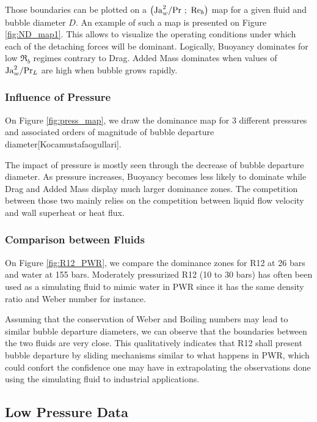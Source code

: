 Those boundaries can be plotted on a $\left( \mathrm{Ja}_{w}^{2}/\mathrm{Pr}\ ;\ \mathrm{Re}_{b} \right)$ map for a given fluid and bubble diameter $D$. An example of such a map is presented on Figure \ref{fig:ND_map1}. This allows to visualize the operating conditions under which each of the detaching forces will be dominant. Logically, Buoyancy dominates for low $\Re_{b}$ regimes contrary to Drag. Added Mass dominates when values of $\mathrm{Ja}_{w}^{2}/\mathrm{Pr}_{L}$ are high \ie when bubble grows rapidly.


\subsubsection{Influence of Pressure}

On Figure \ref{fig:press_map}, we draw the dominance map for 3 different pressures and associated orders of magnitude of bubble departure diameter[Kocamustafaogullari].

The impact of pressure is mostly seen through the decrease of bubble departure diameter. As pressure increases, Buoyancy becomes less likely to dominate while Drag and Added Mass display much larger dominance zones. The competition between those two mainly relies on the competition between liquid flow velocity and wall superheat or heat flux.

 
\subsubsection{Comparison between Fluids}

 
On Figure \ref{fig:R12_PWR}, we compare the dominance zones for R12 at 26 bars and water at 155 bars. Moderately pressurized R12 (10 to 30 bars) has often been used as a simulating fluid to mimic water in PWR since it has the same density ratio and Weber number for instance.

Assuming that the conservation of Weber and Boiling numbers may lead to similar bubble departure diameters, we can observe that the boundaries between the two fluids are very close. This qualitatively indicates that R12 shall present bubble departure by sliding mechanisms similar to what happens in PWR, which could confort the confidence one may have in extrapolating the observations done using the simulating fluid to industrial applications.


\subsection{Low Pressure Data}\label{subsec:lowP_dep}

